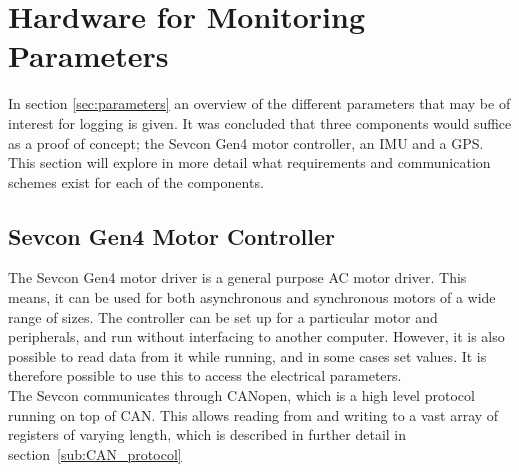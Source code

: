 \section{Hardware for Monitoring Parameters}

\label{sec:hardware_for_par}
In section \ref{sec:parameters} an overview of the different parameters that may be of interest for logging is given.
It was concluded that three components would suffice as a proof of concept; the Sevcon Gen4 motor controller, an IMU and a GPS.
This section will explore in more detail what requirements and communication schemes exist for each of the components.

\subsection{Sevcon Gen4 Motor Controller}
\label{sec:interfacin_with_sevcon}

The Sevcon Gen4 motor driver is a general purpose AC motor driver. 
This means, it can be used for both asynchronous and synchronous motors of a wide range of sizes.
The controller can be set up for a particular motor and peripherals, and run without interfacing to another computer.
However, it is also possible to read data from it while running, and in some cases set values.
It is therefore possible to use this to access the electrical parameters. \\

The Sevcon communicates through CANopen, which is a high level protocol running on top of CAN.
This allows reading from and writing to a vast array of registers of varying length, which is described in further detail in section~\ref{sub:CAN_protocol}\\

